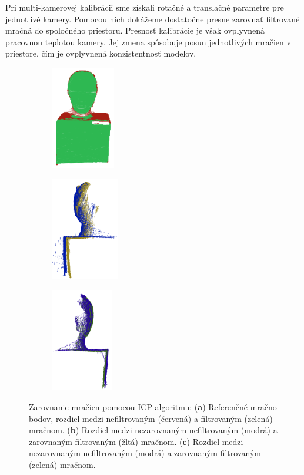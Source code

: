 Pri multi-kamerovej kalibrácii sme získali rotačné a translačné parametre pre jednotlivé kamery. Pomocou nich dokážeme dostatočne presne zarovnať filtrované mračná do spoločného priestoru. Presnosť kalibrácie je však ovplyvnená pracovnou teplotou kamery. Jej zmena spôsobuje posun jednotlivých mračien v priestore, čím je ovplyvnená konzistentnosť modelov.

\begin{figure}[h]
	\centering
	\begin{subfigure}[b]{0.32\textwidth}
		\centering
		\includegraphics[height=4.5cm]{figures/icp1.png}
		\caption{}
		\label{fig:icp:a}
	\end{subfigure}
	\hfill
	\begin{subfigure}[b]{0.32\textwidth}
		\centering
		\includegraphics[height=4.5cm]{figures/icp0.png}
		\caption{}
		\label{fig:icp:b}
	\end{subfigure}
	\hfill
	\begin{subfigure}[b]{0.32\textwidth}
		\centering
		\includegraphics[height=4.5cm]{figures/icp2.png}
		\caption{}
		\label{fig:icp:c}
	\end{subfigure}
	\caption{Zarovnanie mračien pomocou ICP algoritmu: (\textbf{a}) Referenčné mračno bodov, rozdiel medzi nefiltrovaným (červená) a filtrovaným (zelená) mračnom. (\textbf{b}) Rozdiel medzi nezarovnaným nefiltrovaným (modrá) a zarovnaným filtrovaným (žltá) mračnom. (\textbf{c}) Rozdiel medzi nezarovnaným nefiltrovaným (modrá) a zarovnaným filtrovaným (zelená) mračnom.}
	\label{fig:3dm}
\end{figure}

